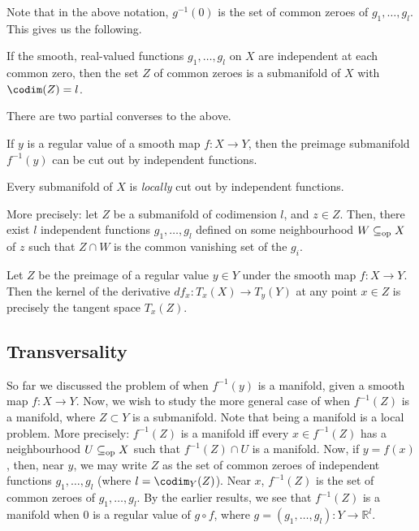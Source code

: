 Note that in the above notation, $g^{-1}(0)$ is the set of common zeroes of $g_{1}, \ldots, g_{l}$. This gives us the following.

\begin{thm}
	If the smooth, real-valued functions $g_{1}, \ldots, g_{l}$ on $X$ are independent at each common zero, then the set $Z$ of common zeroes is a submanifold of $X$ with $\codim(Z) = l$.
\end{thm}

There are two partial converses to the above.

\begin{prop}
	If $y$ is a regular value of a smooth map $f : X \to Y$, then the preimage submanifold $f^{-1}(y)$ can be cut out by independent functions.
\end{prop}

\begin{prop}
	Every submanifold of $X$ is \emph{locally} cut out by independent functions. 

	More precisely: let $Z$ be a submanifold of codimension $l$, and $z \in Z$. Then, there exist $l$ independent functions $g_{1}, \ldots, g_{l}$ defined on some neighbourhood $W \subseteq_{\operatorname{op}} X$ of $z$ such that $Z \cap W$ is the common vanishing set of the $g_{i}$.
\end{prop}

\begin{prop}
	Let $Z$ be the preimage of a regular value $y \in Y$ under the smooth map $f : X \to Y$. Then the kernel of the derivative $df_{x} : T_{x}(X) \to T_{y}(Y)$ at any point $x \in Z$ is precisely the tangent space $T_{x}(Z)$.
\end{prop}

\subsection{Transversality}

So far we discussed the problem of when $f^{-1}(y)$ is a manifold, given a smooth map $f : X \to Y$. Now, we wish to study the more general case of when $f^{-1}(Z)$ is a manifold, where $Z \subset Y$ is a submanifold. Note that being a manifold is a local problem. More precisely: $f^{-1}(Z)$ is a manifold iff every $x \in f^{-1}(Z)$ has a neighbourhood $U \subseteq_{\operatorname{op}} X$ such that $f^{-1}(Z) \cap U$ is a manifold. Now, if $y = f(x)$, then, near $y$, we may write $Z$ as the set of common zeroes of independent functions $g_{1}, \ldots, g_{l}$ (where $l = \codim_{Y}(Z)$). Near $x$, $f^{-1}(Z)$ is the set of common zeroes of $g_{1}, \ldots, g_{l}$. By the earlier results, we see that $f^{-1}(Z)$ is a manifold when $0$ is a regular value of $g \circ f$, where $g = (g_{1}, \ldots, g_{l}) : Y \to \mathbb{R}^{l}$. 

